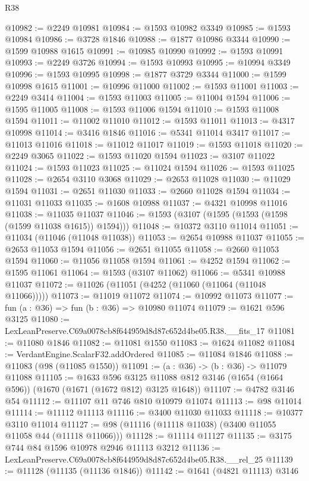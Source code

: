 \begin{lexlean}{R38}
\begin{coremodule}
@10982 := @2249 @10981
@10984 := @1593 @10982 @3349
@10985 := @1593 @10984
@10986 := @3728 @1846
@10988 := @1877 @10986 @3344
@10990 := @1599 @10988 @1615
@10991 := @10985 @10990
@10992 := @1593 @10991
@10993 := @2249 @3726
@10994 := @1593 @10993
@10995 := @10994 @3349
@10996 := @1593 @10995
@10998 := @1877 @3729 @3344
@11000 := @1599 @10998 @1615
@11001 := @10996 @11000
@11002 := @1593 @11001
@11003 := @2249 @3414
@11004 := @1593 @11003
@11005 := @11004 @1594
@11006 := @1595 @11005
@11008 := @1593 @11006 @1594
@11010 := @1593 @11008 @1594
@11011 := @11002 @11010
@11012 := @1593 @11011
@11013 := @4317 @10998
@11014 := @3416 @1846
@11016 := @5341 @11014 @3417
@11017 := @11013 @11016
@11018 := @11012 @11017
@11019 := @1593 @11018
@11020 := @2249 @3065
@11022 := @1593 @11020 @1594
@11023 := @3107 @11022
@11024 := @1593 @11023
@11025 := @11024 @1594
@11026 := @1593 @11025
@11028 := @2654 @3110 @3068
@11029 := @2653 @11028
@11030 := @11029 @1594
@11031 := @2651 @11030
@11033 := @2660 @11028 @1594
@11034 := @11031 @11033
@11035 := @1608 @10988
@11037 := @4321 @10998 @11016
@11038 := @11035 @11037
@11046 := @1593 (@3107 (@1595 (@1593 (@1598 (@1599 @11038 @1615)) @1594)))
@11048 := @10372 @3110 @11014
@11051 := @11034 (@11046 (@11048 @11038))
@11053 := @2654 @10988 @11037
@11055 := @2653 @11053 @1594
@11056 := @2651 @11055
@11058 := @2660 @11053 @1594
@11060 := @11056 @11058 @1594
@11061 := @4252 @1594
@11062 := @1595 @11061
@11064 := @1593 (@3107 @11062)
@11066 := @5341 @10988 @11037
@11072 := @11026 (@11051 (@4252 (@11060 (@11064 (@11048 @11066)))))
@11073 := @11019 @11072
@11074 := @10992 @11073
@11077 := fun (a : @36) => fun (b : @36) => @10980 @11074
@11079 := @1621 @596 @3125
@11080 := LexLeanPreserve.C69a0078cb8f644959d8d87c652d4be05.R38.__fits_17
@11081 := @11080 @1846
@11082 := @11081 @1550
@11083 := @1624 @11082
@11084 := VerdantEngine.ScalarF32.addOrdered
@11085 := @11084 @1846
@11088 := @11083 (@98 (@11085 @1550))
@11091 := (a : @36) -> (b : @36) -> @11079 @11088
@11105 := @1633
    @596
    @3125
    @11088
    @812
    @3146
    (@1654 (@1664 @596))
    (@1670 (@1671 (@1672 @812) @3125 @1648))
@11107 := @4782 @3146 @54
@11112 := @11107 @11 @746 @810 @10979 @11074
@11113 := @98 @11014
@11114 := @11112 @11113
@11116 := @3400 @11030 @11033
@11118 := @10377 @3110 @11014
@11127 := @98 (@11116 (@11118 @11038) (@3400 @11055 @11058 @44 (@11118 @11066)))
@11128 := @11114 @11127
@11135 := @3175 @744 @84 @1596 @10978 @2946 @11113 @3212
@11136 := LexLeanPreserve.C69a0078cb8f644959d8d87c652d4be05.R38.__rel_25
@11139 := @11128 (@11135 (@11136 @1846))
@11142 := @1641 (@4821 @11113) @3146

\end{coremodule}
\end{lexlean}
